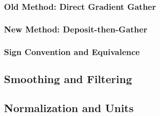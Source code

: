 \subsubsection{Old Method: Direct Gradient Gather}
\subsubsection{New Method: Deposit-then-Gather}
\subsubsection{Sign Convention and Equivalence}


\subsection{Smoothing and Filtering}
\subsection{Normalization and Units}

